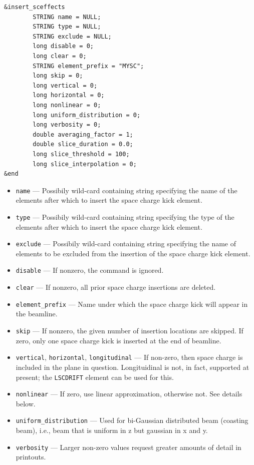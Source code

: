 \documentclass[11pt]{article}
\begin{document}
\begin{verbatim}
&insert_sceffects
        STRING name = NULL;
        STRING type = NULL;
        STRING exclude = NULL;
        long disable = 0;
        long clear = 0;
        STRING element_prefix = "MYSC";
        long skip = 0;
        long vertical = 0;
        long horizontal = 0;
        long nonlinear = 0;
        long uniform_distribution = 0;
        long verbosity = 0;
        double averaging_factor = 1;
        double slice_duration = 0.0;
        long slice_threshold = 100;
        long slice_interpolation = 0;
&end
\end{verbatim}

\begin{itemize}
\item \verb|name| --- Possibily wild-card containing string specifying the
	name of the elements after which to insert the space charge kick element.
\item \verb|type| --- Possibily wild-card containing string specifying the
        type of the elements after which to insert the space charge kick element.
\item \verb|exclude| --- Possibily wild-card containing string specifying 
	the name of elements to be excluded from the insertion of the space charge kick element.
\item \verb|disable| --- If nonzero, the command is ignored.
\item \verb|clear| --- If nonzero, all prior space charge insertions are deleted.
\item \verb|element_prefix| --- Name under which the space charge kick will appear in the beamline.
\item \verb|skip| --- If nonzero, the given number of insertion locations are skipped. 
        If zero, only one space charge kick is inserted at the end of beamline. 
\item \verb|vertical|, \verb|horizontal|, \verb|longitudinal| --- If non-zero, then space charge is
included in the plane in question. Longituidinal is not, in fact, supported at present; the \verb|LSCDRIFT|
element can be used for this.
\item \verb|nonlinear| --- If zero, use linear approximation, otherwise not. See details below.
\item \verb|uniform_distribution| --- Used for bi-Gaussian distributed beam (coasting beam), i.e., beam that is
  uniform in z but gaussian in x and y.
\item \verb|verbosity| --- Larger non-zero values request greater amounts of detail in printouts.

\end{itemize}
\end{document}
